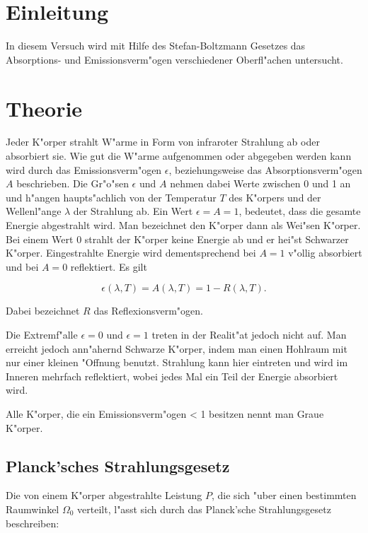 \section{Einleitung}
	\label{sec:einleitung}
	In diesem Versuch wird mit Hilfe des Stefan-Boltzmann Gesetzes das Absorptions- und Emissionsverm"ogen verschiedener Oberfl"achen untersucht.

\section{Theorie}
	\label{sec:theorie}
	Jeder K"orper strahlt W"arme in Form von infraroter Strahlung ab oder absorbiert sie.
	Wie gut die W"arme aufgenommen oder abgegeben werden kann wird durch das E\-mis\-sions\-ver\-m"o\-gen $\epsilon$, beziehungsweise das Absorptionsverm"ogen $A$ beschrieben.
	Die Gr"o"sen $\epsilon$ und $A$ nehmen dabei Werte zwischen 0 und 1 an und h"angen haupts"achlich von der Temperatur $T$ des K"orpers und der Wellenl"ange $\lambda$ der Strahlung ab.
	Ein Wert $\epsilon = A = 1$, bedeutet, dass die gesamte Energie abgestrahlt wird.
	Man bezeichnet den K"orper dann als Wei"sen K"orper.
	Bei einem Wert 0 strahlt der K"orper keine Energie ab und er hei"st Schwarzer K"orper.
	Eingestrahlte Energie wird dementsprechend bei $A = 1$ v"ollig absorbiert und bei $A = 0$ reflektiert.
	Es gilt

	\begin{equation*}
		\epsilon (\lambda, T) = A(\lambda, T) = 1 - R(\lambda, T) .
	\end{equation*}

	Dabei bezeichnet $R$ das Reflexionsverm"ogen.


	Die Extremf"alle $\epsilon = 0$ und $\epsilon = 1$ treten in der Realit"at jedoch nicht auf.
	Man erreicht jedoch ann"ahernd Schwarze K"orper, indem man einen Hohlraum mit nur einer kleinen "Offnung benutzt.
	Strahlung kann hier eintreten und wird im Inneren mehrfach reflektiert, wobei jedes Mal ein Teil der Energie absorbiert wird.

	Alle K"orper, die ein Emissionsverm"ogen < 1 besitzen nennt man Graue K"orper.

	\subsection{Planck'sches Strahlungsgesetz}
		\label{sub:gesetze}

		Die von einem K"orper abgestrahlte Leistung $P$, die sich "uber einen bestimmten Raum\-win\-kel $\Omega_0$ verteilt,
		l"asst sich durch das Planck'sche Strahlungsgesetz beschreiben:

